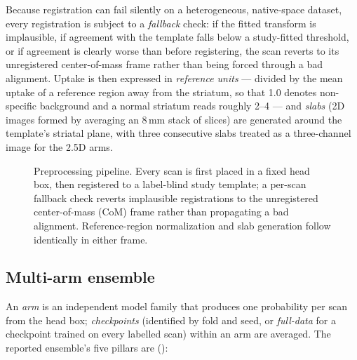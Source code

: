 \documentclass[11pt]{article}
\begin{document}
Because registration can fail silently on a heterogeneous, native-space dataset, every registration is subject to a \emph{fallback} check: if the fitted transform is implausible, if agreement with the template falls below a study-fitted threshold, or if agreement is clearly worse than before registering, the scan reverts to its unregistered center-of-mass frame rather than being forced through a bad alignment. Uptake is then expressed in \emph{reference units} --- divided by the mean uptake of a reference region away from the striatum, so that 1.0 denotes non-specific background and a normal striatum reads roughly 2--4 --- and \emph{slabs} (2D images formed by averaging an 8\,mm stack of slices) are generated around the template's striatal plane, with three consecutive slabs treated as a three-channel image for the 2.5D arms.

\begin{figure}[t]
\centering
\resizebox{\textwidth}{!}{}
\caption{Preprocessing pipeline. Every scan is first placed in a fixed head box, then registered to a label-blind study template; a per-scan fallback check reverts implausible registrations to the unregistered center-of-mass (CoM) frame rather than propagating a bad alignment. Reference-region normalization and slab generation follow identically in either frame.}
\label{fig:preprocessing}
\end{figure}

\subsection{Multi-arm ensemble}
\label{sec:ensemble}

An \emph{arm} is an independent model family that produces one probability per scan from the head box; \emph{checkpoints} (identified by fold and seed, or \emph{full-data} for a checkpoint trained on every labelled scan) within an arm are averaged. The reported ensemble's five pillars are ():
\end{document}

